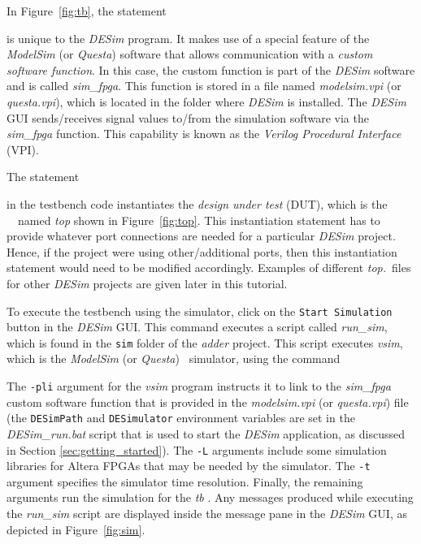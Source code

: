 {In Figure~\ref{fig:tb}, the statement



is unique to the {\it DESim} program. It makes use of a special feature of the
{\it ModelSim} (or {\it Questa}) software that allows communication with a 
{\it custom software function}. In this case, the custom function is part of the {\it DESim} 
software and is called {\it sim\_fpga}. This function is stored in a file named 
{\it modelsim.vpi} (or {\it questa.vpi}), which is located in the folder where {\it DESim} is
installed. The {\it DESim} GUI sends/receives signal values to/from the simulation software 
via the {\it sim\_fpga} function. 
This capability is known as the {\it Verilog Procedural Interface} (VPI). 

The statement



in the testbench code instantiates the {\it design under test} (DUT), which is the 
\hdlName~\hdlModuleName~named {\it top} shown in Figure~\ref{fig:top}. This instantiation
statement has to provide whatever port connections are needed for a particular {\it DESim}
project. Hence, if the project were using other/additional ports, then this
instantiation statement would need to be modified accordingly. Examples of different 
{\it top.\hdlFileExt}~files for other {\it DESim} projects are given later in this tutorial.

To execute the testbench using the simulator, click on the \texttt{Start Simulation} button 
in the {\it DESim} GUI. This command executes a script called {\it run\_sim}, which is found 
in the \texttt{sim} folder of the {\it adder} project. This script executes 
{\it vsim}, which is the {\it ModelSim} (or {\it Questa}) 
\hdlName~simulator, using the command

\ifverilog{}
\else{}\fi

The \texttt{-pli} argument for the {\it vsim} program instructs 
it to link to the {\it sim\_fpga} custom software function that is provided in the
{\it modelsim.vpi} (or {\it questa.vpi}) file (the \texttt{DESimPath} and
\texttt{DESimulator} environment variables are set in the {\it DESim\_run.bat} script that is
used to start the {\it DESim} application, as discussed in Section \ref{sec:getting_started}).
The \texttt{-L} arguments include some simulation libraries for
Altera FPGAs that may be needed by the simulator. The \texttt{-t} argument specifies
the simulator time resolution. Finally, the remaining arguments 
run the simulation for the {\it tb} \hdlModuleName. Any messages 
produced while executing the {\it run\_sim} script are displayed inside the message pane in
the {\it DESim} GUI, as depicted in Figure~\ref{fig:sim}.

}
